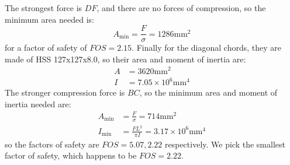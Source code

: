 \documentclass{article}
\begin{document}
The strongest force is $DF$, and there are no forces of compression, so the minimum area needed is:
\begin{equation}
  A_\text{min} = \frac{F}{\sigma} = 1286 \si{\milli\meter\squared}
  \label{eq:}
\end{equation}
for a factor of safety of $FOS=2.15$. Finally for the diagonal chords, they are made of HSS 127x127x8.0, so their area and moment of inertia are:
\begin{align}
  A &= 3620 \si{\milli\meter\squared} \\ 
  I &= 7.05 \times 10^6 \si{\milli\meter\tothe{4}}
\end{align}
The stronger compression force is $BC$, so the minimum area and moment of inertia needed are:
\begin{align}
  A_\text{min} &= \frac{F}{\sigma} = 714 \si{\milli\meter\squared} \\ 
  I_\text{min} &= \frac{FL^2}{\pi I} = 3.17 \times 10^6 \si{\milli\meter\tothe{4}}
\end{align}
so the factors of safety are $FOS=5.07, 2.22$ respectively. We pick the smallest factor of safety, which happens to be $\boxed{FOS=2.22}$.
\end{document}

